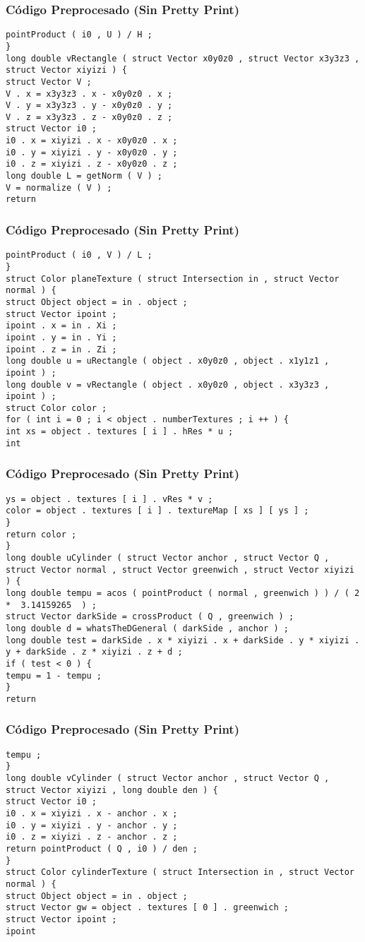 \documentclass{beamer}
\begin{document}
\begin{frame}[fragile]
\frametitle{C\'odigo Preprocesado (Sin Pretty Print)}
\begin{lstlisting}[style=CStyle]
pointProduct ( i0 , U ) / H ; 
} 
long double vRectangle ( struct Vector x0y0z0 , struct Vector x3y3z3 , struct Vector xiyizi ) { 
struct Vector V ; 
V . x = x3y3z3 . x - x0y0z0 . x ; 
V . y = x3y3z3 . y - x0y0z0 . y ; 
V . z = x3y3z3 . z - x0y0z0 . z ; 
struct Vector i0 ; 
i0 . x = xiyizi . x - x0y0z0 . x ; 
i0 . y = xiyizi . y - x0y0z0 . y ; 
i0 . z = xiyizi . z - x0y0z0 . z ; 
long double L = getNorm ( V ) ; 
V = normalize ( V ) ; 
return \end{lstlisting}
\end{frame}
\begin{frame}[fragile]
\frametitle{C\'odigo Preprocesado (Sin Pretty Print)}
\begin{lstlisting}[style=CStyle]
pointProduct ( i0 , V ) / L ; 
} 
struct Color planeTexture ( struct Intersection in , struct Vector normal ) { 
struct Object object = in . object ; 
struct Vector ipoint ; 
ipoint . x = in . Xi ; 
ipoint . y = in . Yi ; 
ipoint . z = in . Zi ; 
long double u = uRectangle ( object . x0y0z0 , object . x1y1z1 , ipoint ) ; 
long double v = vRectangle ( object . x0y0z0 , object . x3y3z3 , ipoint ) ; 
struct Color color ; 
for ( int i = 0 ; i < object . numberTextures ; i ++ ) { 
int xs = object . textures [ i ] . hRes * u ; 
int \end{lstlisting}
\end{frame}
\begin{frame}[fragile]
\frametitle{C\'odigo Preprocesado (Sin Pretty Print)}
\begin{lstlisting}[style=CStyle]
ys = object . textures [ i ] . vRes * v ; 
color = object . textures [ i ] . textureMap [ xs ] [ ys ] ; 
} 
return color ; 
} 
long double uCylinder ( struct Vector anchor , struct Vector Q , struct Vector normal , struct Vector greenwich , struct Vector xiyizi ) { 
long double tempu = acos ( pointProduct ( normal , greenwich ) ) / ( 2 *  3.14159265  ) ; 
struct Vector darkSide = crossProduct ( Q , greenwich ) ; 
long double d = whatsTheDGeneral ( darkSide , anchor ) ; 
long double test = darkSide . x * xiyizi . x + darkSide . y * xiyizi . y + darkSide . z * xiyizi . z + d ; 
if ( test < 0 ) { 
tempu = 1 - tempu ; 
} 
return \end{lstlisting}
\end{frame}
\begin{frame}[fragile]
\frametitle{C\'odigo Preprocesado (Sin Pretty Print)}
\begin{lstlisting}[style=CStyle]
tempu ; 
} 
long double vCylinder ( struct Vector anchor , struct Vector Q , struct Vector xiyizi , long double den ) { 
struct Vector i0 ; 
i0 . x = xiyizi . x - anchor . x ; 
i0 . y = xiyizi . y - anchor . y ; 
i0 . z = xiyizi . z - anchor . z ; 
return pointProduct ( Q , i0 ) / den ; 
} 
struct Color cylinderTexture ( struct Intersection in , struct Vector normal ) { 
struct Object object = in . object ; 
struct Vector gw = object . textures [ 0 ] . greenwich ; 
struct Vector ipoint ; 
ipoint \end{lstlisting}
\end{frame}
\end{document}
